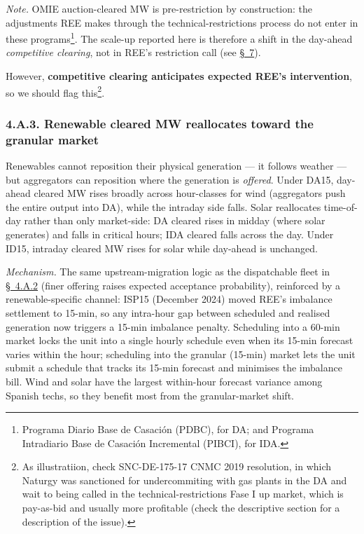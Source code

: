 \documentclass[11pt]{article}
\begin{document}
\emph{Note.} OMIE auction-cleared MW is pre-restriction by construction: the adjustments REE makes through the technical-restrictions process do not enter in these programs\footnote{Programa Diario Base de Casación (PDBC), for DA; and Programa Intradiario Base de Casación Incremental (PIBCI), for IDA.}. The scale-up reported here is therefore a shift in the day-ahead \emph{competitive clearing}, not in REE's restriction call (see \hyperref[sec:context]{\S~7}).

However, \textbf{competitive clearing anticipates expected REE's intervention}, so we should flag this\footnote{As illustratiion, check SNC-DE-175-17 CNMC 2019 resolution, in which Naturgy was sanctioned for undercommiting with gas plants in the DA and wait to being called in the technical-restrictions Fase I up market, which is pay-as-bid and usually more profitable (check the descriptive section for a description of the issue).}.

\subsubsection*{4.A.3. Renewable cleared MW reallocates toward the granular market}\label{sec:4-renewable}
Renewables cannot reposition their physical generation --- it follows weather --- but aggregators can reposition where the generation is \emph{offered}. Under DA15, day-ahead cleared MW rises broadly across hour-classes for wind (aggregators push the entire output into DA), while the intraday side falls. Solar reallocates time-of-day rather than only market-side: DA cleared rises in midday (where solar generates) and falls in critical hours; IDA cleared falls across the day. Under ID15, intraday cleared MW rises for solar while day-ahead is unchanged.

\emph{Mechanism.} The same upstream-migration logic as the dispatchable fleet in \hyperref[sec:4iii]{\S~4.A.2} (finer offering raises expected acceptance probability), reinforced by a renewable-specific channel: ISP15 (December 2024) moved REE's imbalance settlement to 15-min, so any intra-hour gap between scheduled and realised generation now triggers a 15-min imbalance penalty. Scheduling into a 60-min market locks the unit into a single hourly schedule even when its 15-min forecast varies within the hour; scheduling into the granular (15-min) market lets the unit submit a schedule that tracks its 15-min forecast and minimises the imbalance bill. Wind and solar have the largest within-hour forecast variance among Spanish techs, so they benefit most from the granular-market shift.
\end{document}
